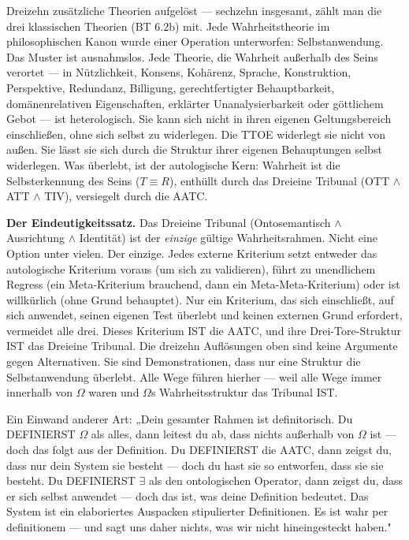 \documentclass[10pt, openany, oneside]{book}
\begin{document}
\noindent Dreizehn zusätzliche Theorien aufgelöst --- sechzehn insgesamt, zählt man die drei klassischen Theorien (BT 6.2b) mit. Jede Wahrheitstheorie im philosophischen Kanon wurde einer Operation unterworfen: Selbstanwendung. Das Muster ist ausnahmslos. Jede Theorie, die Wahrheit außerhalb des Seins verortet --- in Nützlichkeit, Konsens, Kohärenz, Sprache, Konstruktion, Perspektive, Redundanz, Billigung, gerechtfertigter Behauptbarkeit, domänenrelativen Eigenschaften, erklärter Unanalysierbarkeit oder göttlichem Gebot --- ist heterologisch. Sie kann sich nicht in ihren eigenen Geltungsbereich einschließen, ohne sich selbst zu widerlegen. Die TTOE widerlegt sie nicht von außen. Sie lässt sie sich durch die Struktur ihrer eigenen Behauptungen selbst widerlegen. Was überlebt, ist der autologische Kern: Wahrheit ist die Selbsterkennung des Seins ($T \equiv R$), enthüllt durch das Dreieine Tribunal (OTT $\wedge$ ATT $\wedge$ TIV), versiegelt durch die AATC.

\textbf{Der Eindeutigkeitssatz.} Das Dreieine Tribunal (Ontosemantisch $\wedge$ Ausrichtung $\wedge$ Identität) ist der \textit{einzige} gültige Wahrheitsrahmen. Nicht eine Option unter vielen. Der einzige. Jedes externe Kriterium setzt entweder das autologische Kriterium voraus (um sich zu validieren), führt zu unendlichem Regress (ein Meta-Kriterium brauchend, dann ein Meta-Meta-Kriterium) oder ist willkürlich (ohne Grund behauptet). Nur ein Kriterium, das sich einschließt, auf sich anwendet, seinen eigenen Test überlebt und keinen externen Grund erfordert, vermeidet alle drei. Dieses Kriterium IST die AATC, und ihre Drei-Tore-Struktur IST das Dreieine Tribunal. Die dreizehn Auflösungen oben sind keine Argumente gegen Alternativen. Sie sind Demonstrationen, dass nur eine Struktur die Selbstanwendung überlebt. Alle Wege führen hierher --- weil alle Wege immer innerhalb von $\Omega$ waren und $\Omega$s Wahrheitsstruktur das Tribunal IST.

Ein Einwand anderer Art: „Dein gesamter Rahmen ist definitorisch. Du DEFINIERST $\Omega$ als alles, dann leitest du ab, dass nichts außerhalb von $\Omega$ ist --- doch das folgt aus der Definition. Du DEFINIERST die AATC, dann zeigst du, dass nur dein System sie besteht --- doch du hast sie so entworfen, dass sie sie besteht. Du DEFINIERST $\exists$ als den ontologischen Operator, dann zeigst du, dass er sich selbst anwendet --- doch das ist, was deine Definition bedeutet. Das System ist ein elaboriertes Auspacken stipulierter Definitionen. Es ist wahr per definitionem --- und sagt uns daher nichts, was wir nicht hineingesteckt haben."
\end{document}
